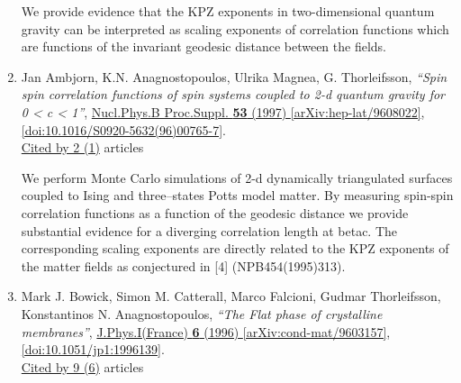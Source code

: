 \documentclass[a4paper,10pt]{article}
\begin{document}
\begin{enumerate}
We provide evidence that the KPZ exponents in two-dimensional quantum gravity can be interpreted as scaling exponents of correlation functions which are functions of the invariant geodesic distance between the fields.
\item Jan Ambjorn, K.N. Anagnostopoulos, Ulrika Magnea, G. Thorleifsson, {\it ``Spin spin correlation functions of spin systems coupled to 2-d quantum gravity for 0 < c < 1''}, \href{https://www.doi.org/10.1016/S0920-5632(96)00765-7}{Nucl.Phys.B Proc.Suppl. {\bf 53} (1997) } \href{https://arxiv.org/abs/hep-lat/9608022}{[arXiv:hep-lat/9608022]}, \href{https://www.doi.org/10.1016/S0920-5632(96)00765-7}{[doi:10.1016/S0920-5632(96)00765-7]}.
\\\href{https://inspirehep.net/literature/?q=refersto%3Arecid%3A421704}{Cited by 2 (1)} articles

We perform Monte Carlo simulations of 2-d dynamically triangulated surfaces coupled to Ising and three--states Potts model matter. By measuring spin-spin correlation functions as a function of the geodesic distance we provide substantial evidence for a diverging correlation length at betac. The corresponding scaling exponents are directly related to the KPZ exponents of the matter fields as conjectured in [4] (NPB454(1995)313).
\item Mark J. Bowick, Simon M. Catterall, Marco Falcioni, Gudmar Thorleifsson, Konstantinos N. Anagnostopoulos, {\it ``The Flat phase of crystalline membranes''}, \href{https://www.doi.org/10.1051/jp1:1996139}{J.Phys.I(France) {\bf 6} (1996) } \href{https://arxiv.org/abs/cond-mat/9603157}{[arXiv:cond-mat/9603157]}, \href{https://www.doi.org/10.1051/jp1:1996139}{[doi:10.1051/jp1:1996139]}.
\\\href{https://inspirehep.net/literature/?q=refersto%3Arecid%3A417130}{Cited by 9 (6)} articles


\end{enumerate}
\end{document}
